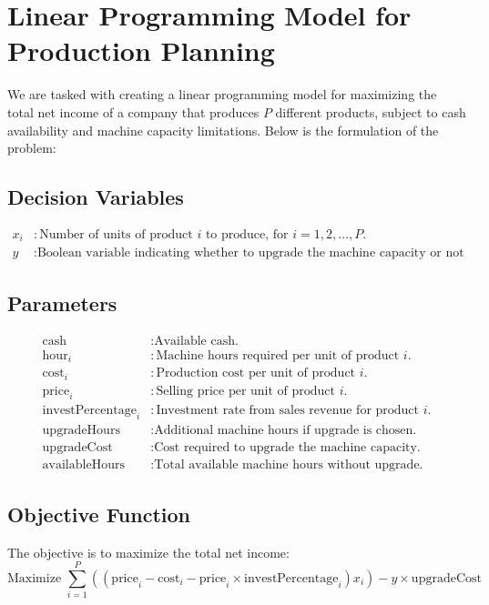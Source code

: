 \documentclass{article}
\begin{document}
\section*{Linear Programming Model for Production Planning}

We are tasked with creating a linear programming model for maximizing the total net income of a company that produces \( P \) different products, subject to cash availability and machine capacity limitations. Below is the formulation of the problem:

\subsection*{Decision Variables}
\begin{align*}
x_i &: \text{Number of units of product } i \text{ to produce, for } i = 1, 2, \ldots, P. \\
y &: \text{Boolean variable indicating whether to upgrade the machine capacity or not (0/1).}
\end{align*}

\subsection*{Parameters}
\begin{align*}
\text{cash} &: \text{Available cash.} \\
\text{hour}_i &: \text{Machine hours required per unit of product } i. \\
\text{cost}_i &: \text{Production cost per unit of product } i. \\
\text{price}_i &: \text{Selling price per unit of product } i. \\
\text{investPercentage}_i &: \text{Investment rate from sales revenue for product } i. \\
\text{upgradeHours} &: \text{Additional machine hours if upgrade is chosen.} \\
\text{upgradeCost} &: \text{Cost required to upgrade the machine capacity.} \\
\text{availableHours} &: \text{Total available machine hours without upgrade.}
\end{align*}

\subsection*{Objective Function}

The objective is to maximize the total net income:
\[
\text{Maximize } \sum_{i=1}^{P} \left( ( \text{price}_i - \text{cost}_i - \text{price}_i \times \text{investPercentage}_i ) x_i \right) - y \times \text{upgradeCost}
\]
\end{document}
